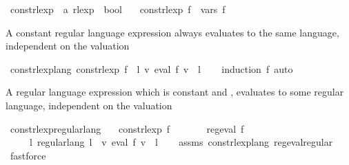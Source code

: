 \begin{isabellebody}
\begin{isamarkuptext}
\end{isamarkuptext}\isamarkuptrue%
\isamarkupfalse%
\ const{\isacharunderscore}{\kern0pt}rlexp\ {\isacharcolon}{\kern0pt}{\isacharcolon}{\kern0pt}\ {\isachardoublequoteopen}{\isacharprime}{\kern0pt}a\ rlexp\ {\isasymRightarrow}\ bool{\isachardoublequoteclose}\ \isanewline
\ \ {\isachardoublequoteopen}const{\isacharunderscore}{\kern0pt}rlexp\ f\ {\isasymequiv}\ vars\ f\ {\isacharequal}{\kern0pt}\ {\isacharbraceleft}{\kern0pt}{\isacharbraceright}{\kern0pt}{\isachardoublequoteclose}%
\begin{isamarkuptext}%
A constant regular language expression always evaluates to the same language, independent on
the valuation%
\end{isamarkuptext}\isamarkuptrue%
\isamarkupfalse%
\ const{\isacharunderscore}{\kern0pt}rlexp{\isacharunderscore}{\kern0pt}lang{\isacharcolon}{\kern0pt}\ {\isachardoublequoteopen}const{\isacharunderscore}{\kern0pt}rlexp\ f\ {\isasymLongrightarrow}\ {\isasymexists}l{\isachardot}{\kern0pt}\ {\isasymforall}v{\isachardot}{\kern0pt}\ eval\ f\ v\ {\isacharequal}{\kern0pt}\ l{\isachardoublequoteclose}\isanewline
%
\isadelimproof
\ \ %
\endisadelimproof
%
\isatagproof
{}\isamarkupfalse%
\ {\isacharparenleft}{\kern0pt}induction\ f{\isacharparenright}{\kern0pt}\ auto%
\endisatagproof
{\isafoldproof}%
%
\isadelimproof
%
\endisadelimproof
%
\begin{isamarkuptext}%
A regular language expression which is constant and , evaluates to some regular
language, independent on the valuation%
\end{isamarkuptext}\isamarkuptrue%
\isamarkupfalse%
\ const{\isacharunderscore}{\kern0pt}rlexp{\isacharunderscore}{\kern0pt}regular{\isacharunderscore}{\kern0pt}lang{\isacharcolon}{\kern0pt}\isanewline
\ \ \ {\isachardoublequoteopen}const{\isacharunderscore}{\kern0pt}rlexp\ f{\isachardoublequoteclose}\isanewline
\ \ \ \ \ \ \ {\isachardoublequoteopen}reg{\isacharunderscore}{\kern0pt}eval\ f{\isachardoublequoteclose}\isanewline
\ \ \ \ \ {\isachardoublequoteopen}{\isasymexists}l{\isachardot}{\kern0pt}\ regular{\isacharunderscore}{\kern0pt}lang\ l\ {\isasymand}\ {\isacharparenleft}{\kern0pt}{\isasymforall}v{\isachardot}{\kern0pt}\ eval\ f\ v\ {\isacharequal}{\kern0pt}\ l{\isacharparenright}{\kern0pt}{\isachardoublequoteclose}\isanewline
%
\isadelimproof
\ \ %
\endisadelimproof
%
\isatagproof
{}\isamarkupfalse%
\ assms\ const{\isacharunderscore}{\kern0pt}rlexp{\isacharunderscore}{\kern0pt}lang\ reg{\isacharunderscore}{\kern0pt}eval{\isacharunderscore}{\kern0pt}regular\ \isamarkupfalse%
\ fastforce%
\endisatagproof
{\isafoldproof}%
%
\isadelimproof
\isanewline
%
\endisadelimproof
%
\isadelimtheory
\isanewline
%
\endisadelimtheory
%
\isatagtheory
{}\isamarkupfalse%
%
\endisatagtheory
{\isafoldtheory}%
%
\isadelimtheory
%
\endisadelimtheory
%
\end{isabellebody}%
